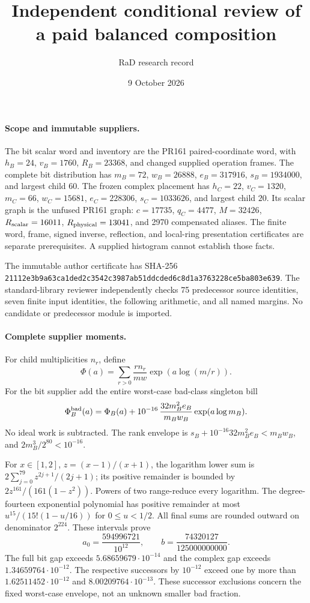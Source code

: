 \documentclass[11pt]{article}
\title{Independent conditional review of a paid balanced composition}
\author{RaD research record}
\date{9 October 2026}
\begin{document}
\maketitle

\paragraph{Scope and immutable suppliers.}
The bit scalar word and inventory are the PR161 paired-coordinate word,
with $h_B=24$, $v_B=1760$, $R_B=23368$, and changed supplied operation
frames. The complete bit distribution has $m_B=72$, $w_B=26888$,
$e_B=317916$, $s_B=1934000$, and largest child $60$.
The frozen complex placement has $h_C=22$, $v_C=1320$, $m_C=66$,
$w_C=15681$, $e_C=228306$, $s_C=1033626$, and largest child $20$.
Its scalar graph is the unfused PR161 graph: $c=17735$, $q_C=4477$,
$M=32426$, $R_{\rm scalar}=16011$, $R_{\rm physical}=13041$,
and 2970 compensated aliases. The finite word, frame, signed inverse,
reflection, and local-ring presentation certificates are separate
prerequisites. A supplied histogram cannot establish those facts.

The immutable author certificate has SHA-256
\texttt{21112e3b9a63ca1ded2c3542c3987ab51ddcded6c8d1a3763228ce5ba803e639}.
The standard-library reviewer independently checks 75 predecessor source
identities, seven finite input identities, the following arithmetic, and
all named margins. No candidate or predecessor module is imported.

\paragraph{Complete supplier moments.}
For child multiplicities $n_r$, define
\[
 \Phi(a)=\sum_{r>0}\frac{r n_r}{mw}\exp(a\log(m/r)).
\]
For the bit supplier add the entire worst-case bad-class singleton bill
\[
 \Phi_B^{\rm bad}(a)=\Phi_B(a)+10^{-16}\,
 \frac{32m_B^2 e_B}{m_Bw_B}\exp(a\log m_B).
\]
No ideal work is subtracted. The rank envelope is
$s_B+10^{-16}32m_B^2e_B<m_Bw_B$, and
$2m_B^3/2^{80}<10^{-16}$.

For $x\in[1,2]$, $z=(x-1)/(x+1)$, the logarithm lower sum is
$2\sum_{j=0}^{79}z^{2j+1}/(2j+1)$; its positive remainder is bounded by
$2z^{161}/(161(1-z^2))$. Powers of two range-reduce every logarithm.
The degree-fourteen exponential polynomial has positive remainder at most
$u^{15}/(15!(1-u/16))$ for $0\le u<1/2$.
All final sums are rounded outward on denominator $2^{224}$.
These intervals prove
\[
 a_0=\frac{594996721}{10^{12}},\qquad
 b=\frac{74320127}{125000000000}.
\]
The full bit gap exceeds $5.68659679\cdot10^{-14}$ and the complex gap
exceeds $1.34659764\cdot10^{-12}$. The respective successors by
$10^{-12}$ exceed one by more than $1.62511452\cdot10^{-12}$ and
$8.00209764\cdot10^{-13}$. These successor exclusions concern the fixed
worst-case envelope, not an unknown smaller bad fraction.
\end{document}
